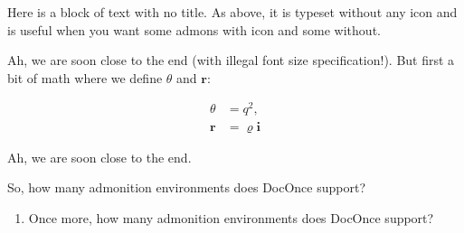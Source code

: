 \documentclass[%
oneside,                 %
final,                   %
10pt]{article}
\newenvironment{noticeshaded}
{\def\FrameCommand{\fboxsep=3mm\colorbox{colors1_notice_background}}
 \MakeFramed {\advance\hsize-\width \FrameRestore}}{\endMakeFramed}
\newenvironment{notice_colors1admon}[1][Notice]{
\begin{noticeshaded}
\noindent
\texttt{[image: latex\_figs/notice]}\ \ \   \textbf{#1}\\ \par
\vspace{-3mm}\nobreak\noindent\ignorespaces
}
{
\end{noticeshaded}
}
\newenvironment{questionshaded}
{\def\FrameCommand{\fboxsep=3mm\colorbox{colors1_question_background}}
 \MakeFramed {\advance\hsize-\width \FrameRestore}}{\endMakeFramed}
\newenvironment{question_colors1admon}[1][Question]{
\begin{questionshaded}
\noindent
\texttt{[image: latex\_figs/question]}\ \ \   \textbf{#1}\\ \par
\vspace{-3mm}\nobreak\noindent\ignorespaces
}
{
\end{questionshaded}
}
\newenvironment{blockshaded}
{\def\FrameCommand{\fboxsep=3mm\colorbox{colors1_block_background}}
 \MakeFramed {\advance\hsize-\width \FrameRestore}}{\endMakeFramed}
\newenvironment{block_colors1admon}[1][Block]{
\begin{blockshaded}
\noindent
  \textbf{#1}\\ \par
\vspace{-3mm}\nobreak\noindent\ignorespaces
}
{
\end{blockshaded}
}
\begin{document}
\begin{block_colors1admon}[]
Here is a block of text with no title. As above, it is typeset without any icon
and is useful when you want some admons with icon and some without.
\end{block_colors1admon} %





\begin{notice_colors1admon}
Ah, we are soon close to the end (with illegal font size specification!).
But first a bit of math where we define $\theta$ and $\bm{r}$:

\begin{align*}
\theta &= q^2,\\
\bm{r} &= \varrho\bm{i}
\end{align*}
\end{notice_colors1admon} %





\begin{notice_colors1admon}[Point1]
Ah, we are soon close to the end.
\end{notice_colors1admon} %




\begin{question_colors1admon}[Question]
So, how many admonition environments does DocOnce support?
\end{question_colors1admon} %




\begin{question_colors1admon}[Question]
\begin{enumerate}
 \item Once more, how many admonition environments does DocOnce support?
\end{enumerate}

\noindent
\end{question_colors1admon} %
\end{document}
